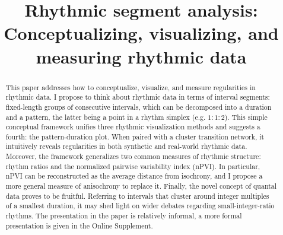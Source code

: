 \documentclass{tMAM2e}%
\theoremstyle{plain}
\theoremstyle{definition}
\theoremstyle{remark}
\begin{document}


\title{Rhythmic segment analysis:\\
Conceptualizing, visualizing, and measuring rhythmic data}

\author{
%
%
\received{}
}

\maketitle

\begin{abstract}
This paper addresses how to conceptualize, visualize, and measure regularities in rhythmic data.
I propose to think about rhythmic data in terms of interval segments: fixed-length groups of consecutive intervals, which can be decomposed into a duration and a pattern, the latter being a point in a rhythm simplex (e.g. $1 : 1 : 2$). 
This simple conceptual framework unifies three rhythmic visualization methods and suggests a fourth: the pattern-duration plot. 
When paired with a cluster transition network, it intuitively reveals regularities in both synthetic and real-world rhythmic data. 
Moreover, the framework generalizes two common measures of rhythmic structure: rhythm ratios and the normalized pairwise variability index (nPVI). 
In particular, nPVI can be reconstructed as the average distance from isochrony, and I propose a more general measure of anisochrony to replace it. 
Finally, the novel concept of quantal data proves to be fruitful. 
Referring to intervals that cluster around integer multiples of a smallest duration, it may shed light on wider debates regarding small-integer-ratio rhythms. 
The presentation in the paper is relatively informal, a more formal presentation is given in the Online Supplement.
\end{abstract}
\end{document}
